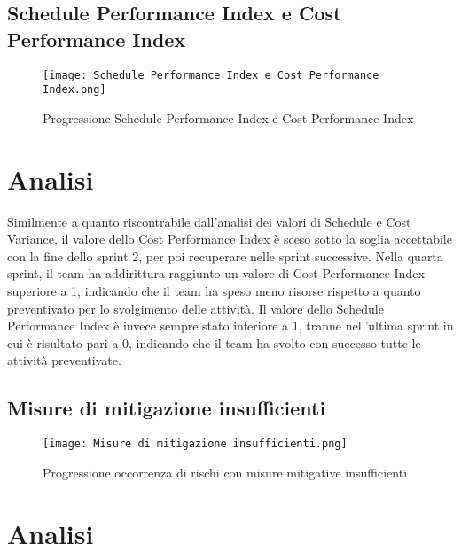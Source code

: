 \newpage

\subsection{Schedule Performance Index e Cost Performance Index}
\label{subsec:Schedule Performance Index e Cost Performance Index}

\begin{figure}[h] 
    \centering
    \texttt{[image: Schedule Performance Index e Cost Performance Index.png]}
    \caption{Progressione Schedule Performance Index e Cost Performance Index} 
    \label{fig: Schedule Performance Index e Cost Performance Index}
\end{figure}

\section*{Analisi}

Similmente a quanto riscontrabile dall’analisi dei valori di Schedule e Cost Variance,
il valore dello Cost Performance Index è sceso sotto la soglia accettabile con la fine 
dello sprint 2, per poi recuperare nelle sprint successive. Nella quarta sprint, il team
ha addirittura raggiunto un valore di Cost Performance Index superiore a 1, indicando
che il team ha speso meno risorse rispetto a quanto preventivato per lo svolgimento delle
attività. Il valore dello Schedule Performance Index è invece sempre stato inferiore a 1,
tranne nell'ultima sprint in cui è risultato pari a 0, indicando che il team ha svolto
con successo tutte le attività preventivate.

\newpage

\subsection{Misure di mitigazione insufficienti}
\label{subsec:Misure di mitigazione insufficienti}

\begin{figure}[h] 
    \centering
    \texttt{[image: Misure di mitigazione insufficienti.png]}
    \caption{Progressione occorrenza di rischi con misure mitigative insufficienti} 
    \label{fig: Misure di mitigazione insufficienti}
\end{figure}

\section*{Analisi}


